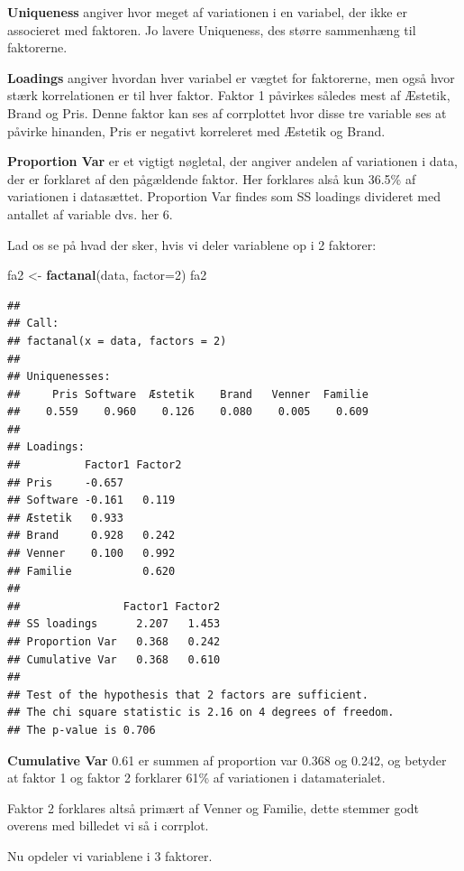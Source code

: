 \documentclass[]{book}
\newenvironment{Shaded}{\begin{snugshade}}{\end{snugshade}}
\newcommand{\DataTypeTok}[1]{\textcolor[rgb]{0.13,0.29,0.53}{#1}}
\newcommand{\DecValTok}[1]{\textcolor[rgb]{0.00,0.00,0.81}{#1}}
\newcommand{\KeywordTok}[1]{\textcolor[rgb]{0.13,0.29,0.53}{\textbf{#1}}}
\newcommand{\NormalTok}[1]{#1}
\newcommand{\StringTok}[1]{\textcolor[rgb]{0.31,0.60,0.02}{#1}}
\begin{document}
\textbf{Uniqueness} angiver hvor meget af variationen i en variabel, der ikke er associeret med faktoren. Jo lavere Uniqueness, des større sammenhæng til faktorerne.

\textbf{Loadings} angiver hvordan hver variabel er vægtet for faktorerne, men også hvor stærk korrelationen er til hver faktor. Faktor 1 påvirkes således mest af Æstetik, Brand og Pris. Denne faktor kan ses af corrplottet hvor disse tre variable ses at påvirke hinanden, Pris er negativt korreleret med Æstetik og Brand.

\textbf{Proportion Var} er et vigtigt nøgletal, der angiver andelen af variationen i data, der er forklaret af den pågældende faktor. Her forklares alså kun 36.5\% af variationen i datasættet. Proportion Var findes som SS loadings divideret med antallet af variable dvs. her 6.

Lad os se på hvad der sker, hvis vi deler variablene op i 2 faktorer:

\begin{Shaded}
\begin{Highlighting}[]
\NormalTok{fa2 <-}\StringTok{ }\KeywordTok{factanal}\NormalTok{(data, }\DataTypeTok{factor=}\DecValTok{2}\NormalTok{)}
\NormalTok{fa2}
\end{Highlighting}
\end{Shaded}

\begin{verbatim}
## 
## Call:
## factanal(x = data, factors = 2)
## 
## Uniquenesses:
##     Pris Software  Æstetik    Brand   Venner  Familie 
##    0.559    0.960    0.126    0.080    0.005    0.609 
## 
## Loadings:
##          Factor1 Factor2
## Pris     -0.657         
## Software -0.161   0.119 
## Æstetik   0.933         
## Brand     0.928   0.242 
## Venner    0.100   0.992 
## Familie           0.620 
## 
##                Factor1 Factor2
## SS loadings      2.207   1.453
## Proportion Var   0.368   0.242
## Cumulative Var   0.368   0.610
## 
## Test of the hypothesis that 2 factors are sufficient.
## The chi square statistic is 2.16 on 4 degrees of freedom.
## The p-value is 0.706
\end{verbatim}

\textbf{Cumulative Var} 0.61 er summen af proportion var 0.368 og 0.242, og betyder at faktor 1 og faktor 2 forklarer 61\% af variationen i datamaterialet.

Faktor 2 forklares altså primært af Venner og Familie, dette stemmer godt overens med billedet vi så i corrplot.

Nu opdeler vi variablene i 3 faktorer.
\end{document}
